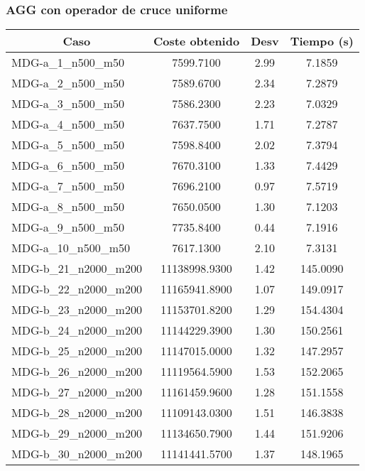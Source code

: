 \documentclass[10pt,a4paper]{article}
\begin{document}
\subsubsection{AGG con operador de cruce uniforme}
\begin{table}[H]
	\begin{center}
		\begin{tabular}{|l|c|c|c|} 
			\hline
			\multicolumn{1}{|c|}{\textbf{Caso}} & \textbf{Coste obtenido} & \textbf{Desv} & \textbf{Tiempo (s)} \\ \hline
		\hline
		MDG-a\_1\_n500\_m50 & 7599.7100 & 2.99 & 7.1859 \\ \hline
		MDG-a\_2\_n500\_m50 & 7589.6700 & 2.34 & 7.2879 \\ \hline
		MDG-a\_3\_n500\_m50 & 7586.2300 & 2.23 & 7.0329 \\ \hline
		MDG-a\_4\_n500\_m50 & 7637.7500 & 1.71 & 7.2787 \\ \hline
		MDG-a\_5\_n500\_m50 & 7598.8400 & 2.02 & 7.3794 \\ \hline
		MDG-a\_6\_n500\_m50 & 7670.3100 & 1.33 & 7.4429 \\ \hline
		MDG-a\_7\_n500\_m50 & 7696.2100 & 0.97 & 7.5719 \\ \hline
		MDG-a\_8\_n500\_m50 & 7650.0500 & 1.30 & 7.1203 \\ \hline
		MDG-a\_9\_n500\_m50 & 7735.8400 & 0.44 & 7.1916 \\ \hline
		MDG-a\_10\_n500\_m50 & 7617.1300 & 2.10 & 7.3131 \\ \hline
		MDG-b\_21\_n2000\_m200 & 11138998.9300 & 1.42 & 145.0090 \\ \hline
		MDG-b\_22\_n2000\_m200 & 11165941.8900 & 1.07 & 149.0917 \\ \hline
		MDG-b\_23\_n2000\_m200 & 11153701.8200 & 1.29 & 154.4304 \\ \hline
		MDG-b\_24\_n2000\_m200 & 11144229.3900 & 1.30 & 150.2561 \\ \hline
		MDG-b\_25\_n2000\_m200 & 11147015.0000 & 1.32 & 147.2957 \\ \hline
		MDG-b\_26\_n2000\_m200 & 11119564.5900 & 1.53 & 152.2065 \\ \hline
		MDG-b\_27\_n2000\_m200 & 11161459.9600 & 1.28 & 151.1558 \\ \hline
		MDG-b\_28\_n2000\_m200 & 11109143.0300 & 1.51 & 146.3838 \\ \hline
		MDG-b\_29\_n2000\_m200 & 11134650.7900 & 1.44 & 151.9206 \\ \hline
		MDG-b\_30\_n2000\_m200 & 11141441.5700 & 1.37 & 148.1965 \\ \hline

\end{tabular}
\end{center}
\end{table}
\end{document}
